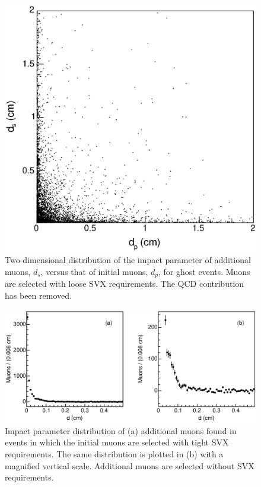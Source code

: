 \documentclass[aps,prd,preprint,floatfix,nofootinbib,superscriptaddress,showpacs,amssymb]{revtex4}
\begin{document}
 \begin{figure}
 \begin{center}
 \vspace{-0.3in}
 \leavevmode
 \includegraphics*[width=\textwidth]{fa0_13.eps}
 \caption[]{Two-dimensional distribution of the impact parameter of 
            additional muons, $d_s$, versus that of initial muons, $d_p$,
            for ghost events. Muons are selected with loose
            SVX requirements. The QCD contribution has been removed.}
 \label{fig:fig_13}
 \end{center}
 \end{figure}
 \begin{figure}
 \begin{center}
 \vspace{-0.3in}
 \leavevmode
 \includegraphics*[width=\textwidth]{fa0_13bis.eps}
 \caption[]{Impact parameter distribution of (a) additional muons found
            in events in which the initial muons are selected with tight
            SVX requirements. The same distribution is plotted in (b) with
            a magnified vertical scale. Additional muons are selected
            without SVX requirements.}
 \label{fig:fig_13bis}
 \end{center}
 \end{figure}
 
\end{document}
